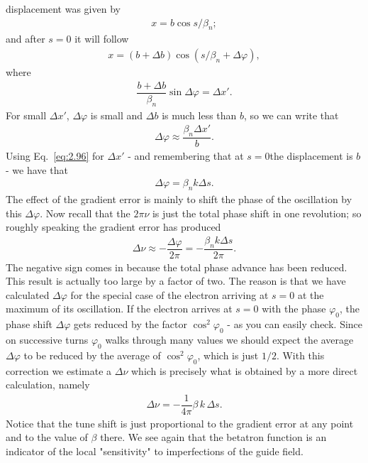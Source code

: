 displacement was given by
\begin{align}
	x = b \cos s/\beta_n;
\end{align}
and after $s = 0$ it will follow
\begin{align}
	x = (b + \Delta b) \cos(s/\beta_n+\Delta\varphi),
\end{align}
where
\begin{align}
	\dfrac{b+\Delta b}{\beta_n} \sin\Delta\varphi = \Delta x'.
\end{align}
For small $\Delta x'$, $\Delta \varphi$ is small and $\Delta b$ is much less than $b$, so we can write that
\begin{align}
	\Delta \varphi \approx \dfrac{\beta_n \Delta x'}{b}.
\end{align}
Using Eq.~\eqref{eq:2.96} for $\Delta x'$ - and remembering that at $s=0$the displacement is $b$ - we have that
\begin{align}
	\Delta \varphi = \beta_n k \Delta s.
\end{align}
The effect of the gradient error is mainly to shift the phase of the oscillation by this $\Delta \varphi$. Now recall that the $2\pi\nu$ is just the total phase shift in one revolution; so roughly speaking the gradient error has produced
\begin{align}
	\Delta\nu \approx -\dfrac{\Delta\varphi}{2\pi} = - \dfrac{\beta_n k \Delta s }{2\pi}.
\end{align}
The negative sign comes in because the total phase advance has been reduced.\\
This result is actually too large by a factor of two. The reason is that we have calculated $\Delta \varphi$ for the special case of the electron arriving at $s = 0$ at the maximum
of its oscillation. If the electron arrives at $s = 0$ with the phase $\varphi_0$, the phase
shift $\Delta\varphi$ gets reduced by the factor $\cos^2\varphi_0$ - as you can easily check.
 Since on successive turns $\varphi_0$ walks through many values we should expect the average $\Delta \varphi$ to be reduced by the average of $\cos^2\varphi_0$, which is just $1/2$. With this correction we estimate a $\Delta\nu$ which is precisely what is obtained by a more direct calculation, namely
\begin{align}
	\Delta\nu = -\dfrac{1}{4\pi}\beta\, k\, \Delta s.
\end{align}
Notice that the tune shift is just proportional to the gradient error at any point and to the value of $\beta$ there. We see again that the betatron function is an indicator of the local "sensitivity" to imperfections of the guide field.\\
